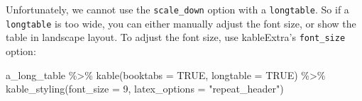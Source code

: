 \documentclass[a4paper, twoside]{templates/ociamthesis}
\newenvironment{Shaded}{\begin{snugshade}}{\end{snugshade}}
\newcommand{\AttributeTok}[1]{\textcolor[rgb]{0.77,0.63,0.00}{#1}}
\newcommand{\ConstantTok}[1]{\textcolor[rgb]{0.00,0.00,0.00}{#1}}
\newcommand{\DecValTok}[1]{\textcolor[rgb]{0.00,0.00,0.81}{#1}}
\newcommand{\FunctionTok}[1]{\textcolor[rgb]{0.00,0.00,0.00}{#1}}
\newcommand{\NormalTok}[1]{#1}
\newcommand{\SpecialCharTok}[1]{\textcolor[rgb]{0.00,0.00,0.00}{#1}}
\newcommand{\StringTok}[1]{\textcolor[rgb]{0.31,0.60,0.02}{#1}}
\renewenvironment{Shaded}
{
  \vspace{10pt}%
  \begin{snugshade}%
}{%
  \end{snugshade}%
  \vspace{8pt}%
}
\begin{document}
Unfortunately, we cannot use the \texttt{scale\_down} option with a \texttt{longtable}.
So if a \texttt{longtable} is too wide, you can either manually adjust the font size, or show the table in landscape layout.
To adjust the font size, use kableExtra's \texttt{font\_size} option:

\begin{Shaded}
\begin{Highlighting}[]
\NormalTok{a\_long\_table }\SpecialCharTok{\%\textgreater{}\%} 
  \FunctionTok{kable}\NormalTok{(}\AttributeTok{booktabs =} \ConstantTok{TRUE}\NormalTok{, }\AttributeTok{longtable =} \ConstantTok{TRUE}\NormalTok{) }\SpecialCharTok{\%\textgreater{}\%} 
  \FunctionTok{kable\_styling}\NormalTok{(}\AttributeTok{font\_size =} \DecValTok{9}\NormalTok{, }\AttributeTok{latex\_options =} \StringTok{"repeat\_header"}\NormalTok{)}
\end{Highlighting}
\end{Shaded}

\begingroup\fontsize{9}{11}\selectfont
\end{document}
